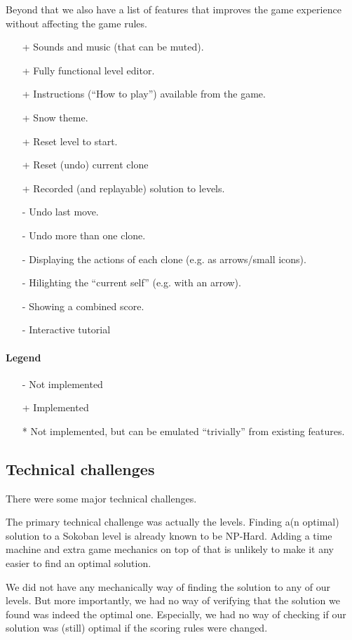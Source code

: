 Beyond that we also have a list of features that improves the game
experience without affecting the game rules.

\begin{itemize}
\item[+] Sounds and music (that can be muted).
\item[+] Fully functional level editor.
\item[+] Instructions (``How to play'') available from the game.
\item[+] Snow theme.
\item[+] Reset level to start.
\item[+] Reset (undo) current clone
\item[+] Recorded (and replayable) solution to levels.
\item[-] Undo last move.
\item[-] Undo more than one clone.
\item[-] Displaying the actions of each clone (e.g. as arrows/small icons).
\item[-] Hilighting the ``current self'' (e.g. with an arrow).
\item[-] Showing a combined score.
\item[-] Interactive tutorial
\end{itemize}

\paragraph{Legend}
\begin{itemize}
\item[-] Not implemented
\item[+] Implemented
\item[*] Not implemented, but can be emulated ``trivially'' from existing
 features.
\end{itemize}

\subsection{Technical challenges}
There were some major technical challenges.

The primary technical challenge was actually the levels.  Finding a(n
optimal) solution to a Sokoban level is already known to be NP-Hard.
Adding a time machine and extra game mechanics on top of that is
unlikely to make it any easier to find an optimal solution.

We did not have any mechanically way of finding the solution to any of
our levels.  But more importantly, we had no way of verifying that the
solution we found was indeed the optimal one.  Especially, we had no
way of checking if our solution was (still) optimal if the scoring rules
were changed.

